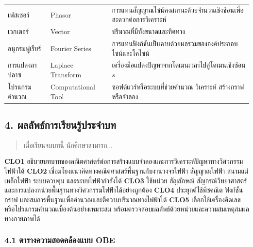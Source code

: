 \begin{table}[htbp]
\begin{tabular}{l l l}
        เฟสเซอร์ & Phasor & การแทนสัญญาณไซน์คงสถานะด้วยจำนวนเชิงซ้อนเพื่อสะดวกต่อการวิเคราะห์ \\
        เวกเตอร์ & Vector & ปริมาณที่มีทั้งขนาดและทิศทาง \\
        อนุกรมฟูเรียร์ & Fourier Series & การแทนฟังก์ชันเป็นคาบด้วยผลรวมขององค์ประกอบไซน์และโคไซน์ \\
        การแปลงลาปลาซ & Laplace Transform & เครื่องมือแปลงปัญหาจากโดเมนเวลาไปสู่โดเมนเชิงซ้อน $s$ \\
        โปรแกรมคำนวณ & Computational Tool & ซอฟต์แวร์หรือระบบที่ช่วยคำนวณ วิเคราะห์ สร้างกราฟ หรือจำลอง \\
        \hline
    \end{tabular}
\end{table}

\subsection{4. ผลลัพธ์การเรียนรู้ประจำบท}

\begin{quote}
เมื่อเรียนจบบทนี้ นักศึกษาสามารถ...
\end{quote}

\textbf{CLO1} อธิบายบทบาทของคณิตศาสตร์ต่อการสร้างแบบจำลองและการวิเคราะห์ปัญหาทางวิศวกรรมไฟฟ้าได้
\textbf{CLO2} เชื่อมโยงแนวคิดทางคณิตศาสตร์พื้นฐานกับงานวงจรไฟฟ้า สัญญาณไฟฟ้า สนามแม่เหล็กไฟฟ้า ระบบควบคุม และระบบไฟฟ้ากำลังได้
\textbf{CLO3} ใช้หน่วย สัญลักษณ์ สัญกรณ์วิทยาศาสตร์ และการแปลงหน่วยพื้นฐานทางวิศวกรรมไฟฟ้าได้อย่างถูกต้อง
\textbf{CLO4} ประยุกต์ใช้พีชคณิต ฟังก์ชัน กราฟ และสมการพื้นฐานเพื่อคำนวณและตีความปริมาณทางไฟฟ้าได้
\textbf{CLO5} เลือกใช้เครื่องคิดเลขหรือโปรแกรมคำนวณเบื้องต้นอย่างเหมาะสม พร้อมตรวจสอบผลลัพธ์ด้วยหน่วยและความสมเหตุสมผลทางกายภาพได้

\subsubsection{4.1 ตารางความสอดคล้องแบบ OBE}

